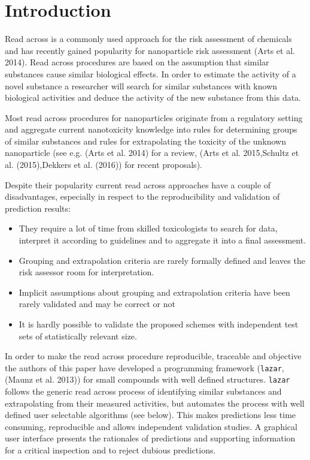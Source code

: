 \documentclass[utf8]{frontiersHLTH} %
\providecommand{\tightlist}{%
  \setlength{\itemsep}{0pt}\setlength{\parskip}{0pt}}
\begin{document}
\section{Introduction}\label{introduction}

Read across is a commonly used approach for the risk assessment of
chemicals and has recently gained popularity for nanoparticle risk
assessment (Arts et al. 2014). Read across procedures are based on the
assumption that similar substances cause similar biological effects. In
order to estimate the activity of a novel substance a researcher will
search for similar substances with known biological activities and
deduce the activity of the new substance from this data.

Most read across procedures for nanoparticles originate from a
regulatory setting and aggregate current nanotoxicity knowledge into
rules for determining groups of similar substances and rules for
extrapolating the toxicity of the unknown nanoparticle (see e.g. (Arts
et al. 2014) for a review, (Arts et al. 2015,Schultz et al.
(2015),Dekkers et al. (2016)) for recent proposals).

Despite their popularity current read across approaches have a couple of
disadvantages, especially in respect to the reproducibility and
validation of prediction results:

\begin{itemize}
\tightlist
\item
  They require a lot of time from skilled toxicologists to search for
  data, interpret it according to guidelines and to aggregate it into a
  final assessment.
\item
  Grouping and extrapolation criteria are rarely formally defined and
  leaves the risk assessor room for interpretation.
\item
  Implicit assumptions about grouping and extrapolation criteria have
  been rarely validated and may be correct or not
\item
  It is hardly possible to validate the proposed schemes with
  independent test sets of statistically relevant size.
\end{itemize}

In order to make the read across procedure reproducible, traceable and
objective the authors of this paper have developed a programming
framework (\texttt{lazar}, (Maunz et al. 2013)) for small compounds with
well defined structures. \texttt{lazar} follows the generic read across
process of identifying similar substances and extrapolating from their
measured activities, but automates the process with well defined user
selectable algorithms (see below). This makes predictions less time
consuming, reproducible and allows independent validation studies. A
graphical user interface presents the rationales of predictions and
supporting information for a critical inspection and to reject dubious
predictions.
\end{document}
